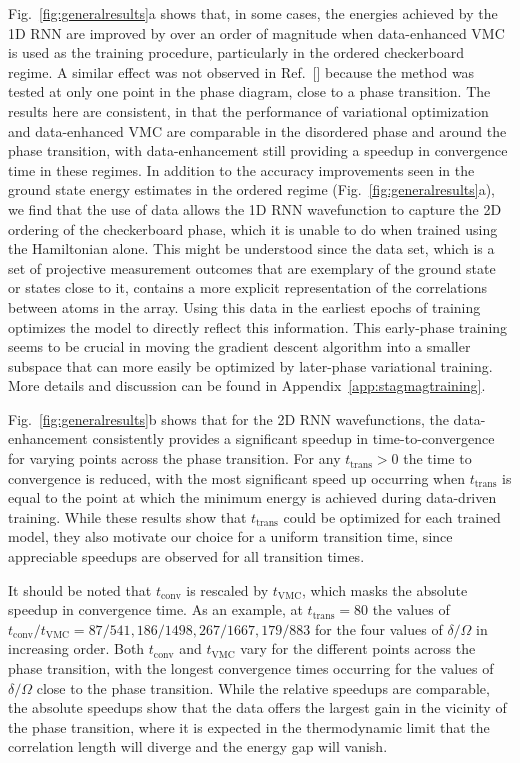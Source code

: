 \documentclass[twocolumn,
                showpacs,
                nofootinbib,
                nobibnotes,
                aps,
                superscriptaddress,
                amssymb,
                amsmath,
                floatfix,
                reprint,
                prx, 
                notitlepage,
                showkeys,
                10pt,
		]{revtex4-2}
\begin{document}
Fig.~\ref{fig:generalresults}a shows that, in some cases, the energies achieved by the 1D RNN are improved by over an order of magnitude when data-enhanced VMC is used as the training procedure, particularly 
in the ordered checkerboard regime.
A similar effect was not observed in Ref.~[] because the method was tested at only one point in the phase diagram, close to a phase transition. The results here are consistent, in that the performance of variational optimization and data-enhanced VMC are comparable in the disordered phase and around the phase transition, with data-enhancement still providing a speedup in convergence time in these regimes. 
In addition to the accuracy improvements seen in the ground state energy estimates in the ordered regime (Fig.~\ref{fig:generalresults}a), we find that the use of data allows the 1D RNN wavefunction to capture the 2D ordering of the checkerboard phase, which it is unable to do when trained using the Hamiltonian alone. 
This might be understood since the data set, which is a set of projective measurement outcomes that are exemplary of the ground state or states close to it, contains a more explicit representation of the correlations between atoms in the array. 
Using this data in the earliest epochs of training optimizes the model to directly reflect this information. This early-phase training seems to be crucial in moving the gradient descent algorithm into a smaller subspace that can more easily be optimized by later-phase variational training. 
More details and discussion can be found in Appendix~\ref{app:stagmagtraining}.

Fig.~\ref{fig:generalresults}b shows that for the 2D RNN wavefunctions, the data-enhancement consistently provides a significant speedup in time-to-convergence for varying points across the phase transition. 
For any $t_{\text{trans}} > 0$ the time to convergence is reduced, with the most significant speed up occurring when $t_{\text{trans}}$ is equal to the point at which the minimum energy is achieved during data-driven training. While these results show that $t_{\text{trans}}$ could be optimized for each trained model, they also motivate our choice for a uniform transition time, since appreciable speedups are observed for all transition times.

It should be noted that $t_{\text{conv}}$ is rescaled by $t_{\text{VMC}}$, which masks the absolute speedup in convergence time. As an example, at $t_{\text{trans}}=80$ the values of $t_{\text{conv}}/t_{\text{VMC}} = 87/541,186/1498,267/1667,179/883$ for the four values of $\delta/\Omega$ in increasing order. Both $t_{\text{conv}}$ and  $t_{\text{VMC}}$ vary for the different points across the phase transition, with the longest convergence times occurring for the values of $\delta/\Omega$ close to the phase transition. While the relative speedups are comparable, the absolute speedups show that the data offers the largest gain in the vicinity of the phase transition, where it is expected in the thermodynamic limit that the correlation length will diverge and the energy gap will vanish.
\end{document}
